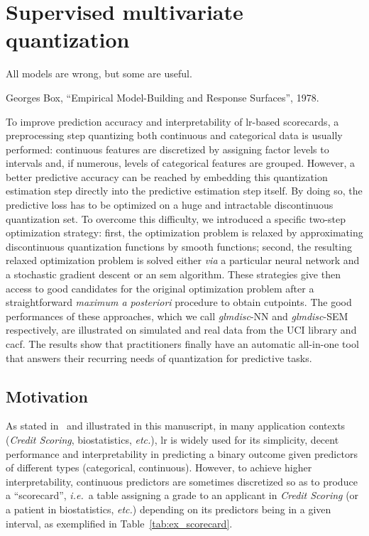\chapter{Supervised multivariate quantization} \label{chap4}


\epigraph{All models are wrong, but some are useful.}{Georges Box, ``Empirical Model-Building and Response Surfaces'', 1978.}

\minitoc


\bigskip

To improve prediction accuracy and interpretability of \gls{lr}-based scorecards, a preprocessing step quantizing both continuous and categorical data is usually performed: continuous features are discretized by assigning factor levels to intervals and, if numerous, levels of categorical features are grouped. However, a better predictive accuracy can be reached by embedding this quantization estimation step directly into the predictive estimation step itself. By doing so, the predictive loss has to be optimized on a huge and intractable discontinuous quantization set. To overcome this difficulty, we introduced a specific two-step optimization strategy: first, the optimization problem is relaxed by approximating discontinuous quantization functions by smooth functions; second, the resulting relaxed optimization problem is solved either \textit{via} a particular neural network and a stochastic gradient descent or an \gls{sem} algorithm. These strategies give then access to good candidates for the original optimization problem after a straightforward \textit{maximum a posteriori} procedure to obtain cutpoints. The good performances of these approaches, which we call \textit{glmdisc}-NN and \textit{glmdisc}-SEM respectively, are illustrated on simulated and real data from the UCI library and \gls{cacf}. The results show that practitioners finally have an automatic all-in-one tool that answers their recurring needs of quantization for predictive tasks.
 
\section{Motivation} \label{sec:motivation}

As stated in~\cite{hosmer2013applied} and illustrated in this manuscript, in many application contexts (\textit{Credit Scoring}, biostatistics, {\it etc.}), \gls{lr} is widely used for its simplicity, decent performance and interpretability in predicting a binary outcome given predictors of different types (categorical, continuous). However, to achieve  higher interpretability, continuous predictors are sometimes discretized so as to produce a ``scorecard'', \textit{i.e.}\ a table assigning a grade to an applicant in \textit{Credit Scoring} (or a patient in biostatistics, {\it etc.}) depending on its predictors being in a given interval, as exemplified in Table~\ref{tab:ex_scorecard}.

